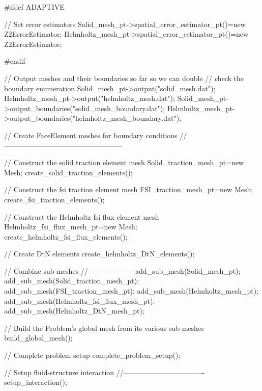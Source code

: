 \begin{DoxyCodeInclude}
\textcolor{preprocessor}{#ifdef ADAPTIVE}

 \textcolor{comment}{// Set error estimators}
 Solid\_mesh\_pt->spatial\_error\_estimator\_pt()=\textcolor{keyword}{new} Z2ErrorEstimator;
 Helmholtz\_mesh\_pt->spatial\_error\_estimator\_pt()=\textcolor{keyword}{new} Z2ErrorEstimator;

\textcolor{preprocessor}{#endif}

 \textcolor{comment}{// Output meshes and their boundaries so far so we can double }
 \textcolor{comment}{// check the boundary enumeration}
 Solid\_mesh\_pt->output(\textcolor{stringliteral}{"solid\_mesh.dat"});
 Helmholtz\_mesh\_pt->output(\textcolor{stringliteral}{"helmholtz\_mesh.dat"});
 Solid\_mesh\_pt->output\_boundaries(\textcolor{stringliteral}{"solid\_mesh\_boundary.dat"});
 Helmholtz\_mesh\_pt->output\_boundaries(\textcolor{stringliteral}{"helmholtz\_mesh\_boundary.dat"});

 \textcolor{comment}{// Create FaceElement meshes for boundary conditions}
 \textcolor{comment}{//--------------------------------------------------}
 
 \textcolor{comment}{// Construct the solid traction element mesh}
 Solid\_traction\_mesh\_pt=\textcolor{keyword}{new} Mesh;
 create\_solid\_traction\_elements(); 

 \textcolor{comment}{// Construct the fsi traction element mesh}
 FSI\_traction\_mesh\_pt=\textcolor{keyword}{new} Mesh;
 create\_fsi\_traction\_elements();
 
 \textcolor{comment}{// Construct the Helmholtz fsi flux element mesh}
 Helmholtz\_fsi\_flux\_mesh\_pt=\textcolor{keyword}{new} Mesh;
 create\_helmholtz\_fsi\_flux\_elements();
 
 \textcolor{comment}{// Create DtN elements}
 create\_helmholtz\_DtN\_elements();

 \textcolor{comment}{// Combine sub meshes}
 \textcolor{comment}{//-------------------}
 add\_sub\_mesh(Solid\_mesh\_pt);
 add\_sub\_mesh(Solid\_traction\_mesh\_pt);
 add\_sub\_mesh(FSI\_traction\_mesh\_pt);
 add\_sub\_mesh(Helmholtz\_mesh\_pt);
 add\_sub\_mesh(Helmholtz\_fsi\_flux\_mesh\_pt);
 add\_sub\_mesh(Helmholtz\_DtN\_mesh\_pt); 
 
 \textcolor{comment}{// Build the Problem's global mesh from its various sub-meshes}
 build\_global\_mesh();
 
 \textcolor{comment}{// Complete problem setup}
 complete\_problem\_setup();
 
 \textcolor{comment}{// Setup fluid-structure interaction}
 \textcolor{comment}{//----------------------------------}
 setup\_interaction();


\end{DoxyCodeInclude}
